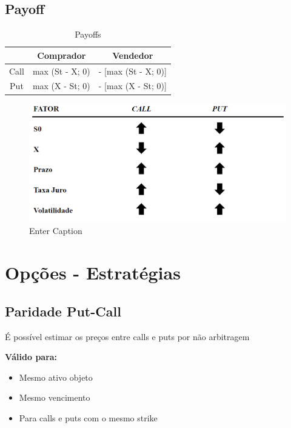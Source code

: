 \documentclass{sciposter}
\begin{document}
\begin{multicols}{3}
\subsection*{Payoff}
\begin{table}
    \centering
    \begin{tabular}{|c|c|c|} \hline 
         &  Comprador& Vendedor\\ \hline 
         Call&  max (St - X; 0)& - [max (St - X; 0)]\\ \hline 
         Put&  max (X - St; 0)& - [max (X - St; 0)]\\ \hline
    \end{tabular}
    \caption{Payoffs}
    \label{tab:my_label}
\end{table}
\begin{figure}
    \centering
    \includegraphics[width=1\linewidth]{image.png}
    \caption{Enter Caption}
    
\end{figure}
\section{Opções - Estratégias}
\subsection*{\textbf{Paridade Put-Call}}
\begin{center}
\end{center} 
É possível estimar os preços entre calls e puts por não arbitragem

\textbf{Válido para:}
\begin{itemize}
    \item Mesmo ativo objeto
    \item Mesmo vencimento
    \item Para calls e puts com o mesmo strike
\end{itemize}
\vspace{0.75 cm}

\end{multicols}
\end{document}
